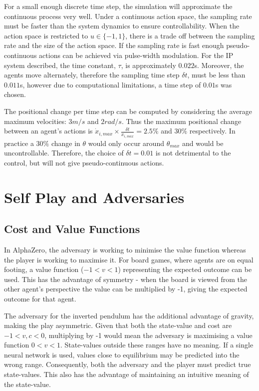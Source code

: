\documentclass[../main.tex]{subfiles}
\begin{document}
For a small enough discrete time step, the simulation will approximate the continuous process very well. Under a continuous action space, the sampling rate must be faster than the system dynamics to ensure controllability. When the action space is restricted to $u \in \{-1, 1\}$, there is a trade off between the sampling rate and the size of the action space. If the sampling rate is fast enough pseudo-continuous actions can be achieved via pulse-width modulation. For the IP system described, the time constant, $\tau$, is approximately $0.022$s. Moreover, the agents move alternately, therefore the sampling time step $ \delta t$, must be  less than  $0.011$s, however due to computational limitations, a time step of $0.01$s was chosen.

The positional change per time step can be computed by considering the average maximum velocities: $3m/s$ and $2rad/s$. Thus the maximum positional change between an agent's actions is $\dot{x}_{i, max} \times \frac{\delta t}{x_{i, max}} = 2.5\%$ and $30\%$ respectively. In practice a $30\%$ change in $\theta$ would only occur around $\theta_{max}$ and would be uncontrollable. Therefore, the choice of $\delta t = 0.01$ is not detrimental to the control, but will not give pseudo-continuous actions.

\section{Self Play and Adversaries}

\subsection{Cost and Value Functions}

In AlphaZero, the adversary is working to minimise the value function whereas the player is working to maximise it. For board games, where agents are on equal footing, a value function ($-1 < v < 1$) representing the expected outcome can be used. This has the advantage of symmetry - when the board is viewed from the other agent's perspective the value can be multiplied by -1, giving the expected outcome for that agent.

The adversary for the inverted pendulum has the additional advantage of gravity, making the play asymmetric. Given that both the state-value and cost are $-1 < v, c < 0$, multiplying by -1 would mean the adversary is maximising a value function $0 < v < 1$. State-values outside these ranges have no meaning. If a single neural network is used, values close to equilibrium may be predicted into the wrong range. Consequently, both the adversary and the player must predict true state-values. This also has the advantage of maintaining an intuitive meaning of the state-value.
\end{document}
